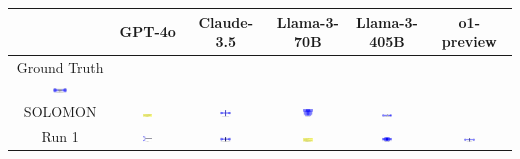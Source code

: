 \begin{table}[H]
    \centering
    \begin{tabular}{|c|c|c|c|c|c|}
    \hline
    & GPT-4o & Claude-3.5 & Llama-3-70B & Llama-3-405B & o1-preview \\
    \hline
    Ground Truth {\includegraphics[width=0.15\textwidth]{examples_png/DLDChip.png}} & & & & &  \\
    \hline
    SOLOMON & \includegraphics[width=0.15\textwidth]{./pool_all/png/gpt-4o_results/DLDChip.png} & \includegraphics[width=0.15\textwidth]{./pool_all/png/claude-3-5-sonnet-20240620_results/DLDChip.png} & \includegraphics[width=0.15\textwidth]{./pool_all/png/watsonx_meta-llama_llama-3-1-70b-instruct_results/DLDChip.png} & \includegraphics[width=0.15\textwidth]{./pool_all/png/watsonx_meta-llama_llama-3-405b-instruct_results/DLDChip.png} & \\
    \hline
    Run 1 & \includegraphics[width=0.15\textwidth]{./run_1/png/gpt-4o_results/DLDChip.png} & \includegraphics[width=0.15\textwidth]{./run_1/png/claude-3-5-sonnet-20240620_results/DLDChip.png} & \includegraphics[width=0.15\textwidth]{./run_1/png/watsonx_meta-llama_llama-3-1-70b-instruct_results/DLDChip.png} & \includegraphics[width=0.15\textwidth]{./run_1/png/watsonx_meta-llama_llama-3-405b-instruct_results/DLDChip.png} & \includegraphics[width=0.15\textwidth]{./run_1/png/o1-preview_results/DLDChip.png} \\

\end{tabular}
\end{table}

